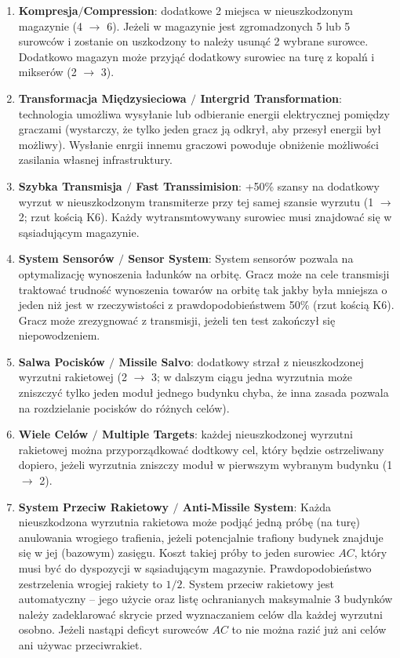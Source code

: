 \documentclass[11pt,a4paper]{article}
\begin{document}
\begin{enumerate}
\item \textbf{Kompresja$/$Compression}: dodatkowe 2 miejsca w nieuszkodzonym magazynie (4 $\to$ 6). Jeżeli w magazynie jest zgromadzonych 5 lub 5 surowców i zostanie on uszkodzony to należy usunąć 2 wybrane surowce. Dodatkowo magazyn może przyjąć dodatkowy surowiec na turę z kopalń i mikserów (2 $\to$ 3).
\item \textbf{Transformacja Międzysieciowa $/$ Intergrid Transformation}: technologia umożliwa wysyłanie lub odbieranie energii elektrycznej pomiędzy graczami (wystarczy, że tylko jeden gracz ją odkrył, aby przesył energii był możliwy). Wysłanie enrgii innemu graczowi powoduje obniżenie możliwości zasilania własnej infrastruktury.
\item \textbf{Szybka Transmisja $/$ Fast Transsimision}: +50\% szansy na dodatkowy wyrzut w nieuszkodzonym transmiterze przy tej samej szansie wyrzutu (1 $\to$ 2; rzut kością K6). Każdy wytransmtowywany surowiec musi znajdować się w sąsiadującym magazynie.
\item \textbf{System Sensorów $/$ Sensor System}: System sensorów pozwala na optymalizację wynoszenia ładunków na orbitę. Gracz może na cele transmisji traktować trudność wynoszenia towarów na orbitę tak jakby była mniejsza o jeden niż jest w rzeczywistości z prawdopodobieństwem 50\% (rzut kością K6). Gracz może zrezygnować z transmisji, jeżeli ten test zakończył się niepowodzeniem.
\item \textbf{Salwa Pocisków $/$ Missile Salvo}: dodatkowy strzał z nieuszkodzonej wyrzutni rakietowej (2 $\to$ 3; w dalszym ciągu jedna wyrzutnia może zniszczyć tylko jeden moduł jednego budynku chyba, że inna zasada pozwala na rozdzielanie pocisków do różnych celów).
\item \textbf{Wiele Celów $/$ Multiple Targets}: każdej nieuszkodzonej wyrzutni rakietowej można przyporządkować dodtkowy cel, który będzie ostrzeliwany dopiero, jeżeli wyrzutnia zniszczy moduł w pierwszym wybranym budynku (1 $\to$ 2).
\item \textbf{System Przeciw Rakietowy $/$ Anti-Missile System}: Każda nieuszkodzona wyrzutnia rakietowa może podjąć jedną próbę (na turę) anulowania wrogiego trafienia, jeżeli potencjalnie trafiony budynek znajduje się w jej (bazowym) zasięgu. Koszt takiej próby to jeden surowiec $AC$, który musi być do dyspozycji w sąsiadującym magazynie. Prawdopodobieństwo zestrzelenia wrogiej rakiety to $1/2$. System przeciw rakietowy jest automatyczny -- jego użycie oraz listę ochranianych maksymalnie 3 budynków należy zadeklarować skrycie przed wyznaczaniem celów dla każdej wyrzutni osobno. Jeżeli nastąpi deficyt surowców $AC$ to nie można razić już ani celów ani używac przeciwrakiet.

\end{enumerate}
\end{document}
